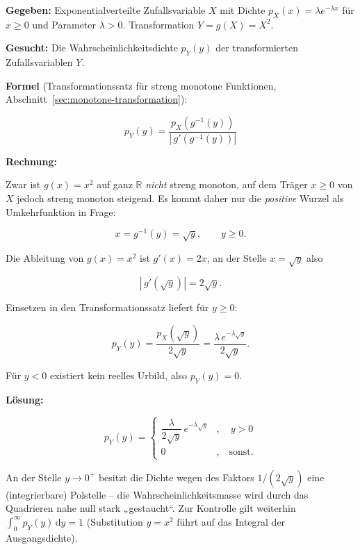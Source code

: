 \begin{beispiel}[Funktion einer Zufallsvariablen -- $Y = X^2$]

\textbf{Gegeben:} Exponentialverteilte Zufallsvariable $X$ mit Dichte
$p_X(x) = \lambda e^{-\lambda x}$ für $x \geq 0$ und Parameter $\lambda > 0$.
Transformation $Y = g(X) = X^2$.

\textbf{Gesucht:} Die Wahrscheinlichkeitsdichte $p_Y(y)$ der transformierten
Zufallsvariablen $Y$.

\textbf{Formel} (Transformationssatz für streng monotone Funktionen,
Abschnitt~\ref{sec:monotone-transformation}):

$$
p_Y(y) = \frac{p_X\!\left(g^{-1}(y)\right)}{\left|\, g'\!\left(g^{-1}(y)\right)\right|}
$$

\textbf{Rechnung:}

Zwar ist $g(x) = x^2$ auf ganz $\mathbb{R}$ \emph{nicht} streng monoton, auf dem
Träger $x \geq 0$ von $X$ jedoch streng monoton steigend. Es kommt daher nur die
\emph{positive} Wurzel als Umkehrfunktion in Frage:

$$
x = g^{-1}(y) = \sqrt{y}, \qquad y \geq 0.
$$

Die Ableitung von $g(x) = x^2$ ist $g'(x) = 2x$, an der Stelle $x = \sqrt{y}$
also

$$
\left|\, g'\!\left(\sqrt{y}\right)\right| = 2\sqrt{y}.
$$

Einsetzen in den Transformationssatz liefert für $y \geq 0$:

$$
p_Y(y) = \frac{p_X\!\left(\sqrt{y}\right)}{2\sqrt{y}}
       = \frac{\lambda\, e^{-\lambda \sqrt{y}}}{2\sqrt{y}}.
$$

Für $y < 0$ existiert kein reelles Urbild, also $p_Y(y) = 0$.

\textbf{Lösung:}

$$
\boxed{\;p_Y(y) = \begin{cases}
\dfrac{\lambda}{2\sqrt{y}}\, e^{-\lambda \sqrt{y}} & , \quad y > 0 \\[8pt]
0 & , \quad \text{sonst.}
\end{cases}\;}
$$

An der Stelle $y \to 0^+$ besitzt die Dichte wegen des Faktors
$1/(2\sqrt{y})$ eine (integrierbare) Polstelle -- die Wahrscheinlichkeitsmasse
wird durch das Quadrieren nahe null stark „gestaucht``. Zur Kontrolle gilt
weiterhin $\int_0^\infty p_Y(y)\,\mathrm{d}y = 1$ (Substitution
$y = x^2$ führt auf das Integral der Ausgangsdichte).

\end{beispiel}

